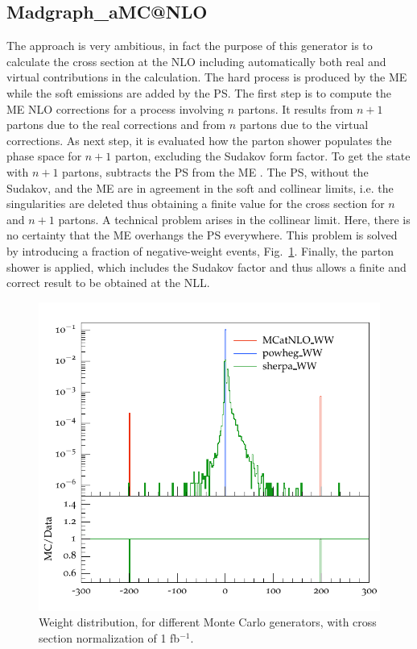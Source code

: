 \subsection*{Madgraph\_aM{\footnotesize C@NLO}}
The \aMC \cite{bib:madgraph} approach is very ambitious, in fact the purpose of this generator is to calculate the cross section at the NLO including automatically both real and virtual contributions in the calculation. The  hard process is produced by the ME  while the soft emissions are added by the PS.
The first step is to compute the ME NLO corrections for a process involving $n$ partons. 
It results from  $n+1$ partons due to the real corrections and from $n$ partons due to the virtual corrections. 
As next step, it is evaluated  how the parton shower populates the phase space for $ n + 1 $ parton, excluding the Sudakov form factor. 
To get the state with $n+1$ partons, \aMC subtracts the PS  from the ME . 
The PS, without the Sudakov,  and the ME are in agreement in the soft and collinear limits, i.e. the singularities are deleted thus obtaining a finite value for the cross section for $ n $ and $ n + 1 $ partons. 
A technical problem arises in the collinear limit. Here, there is no certainty that the ME overhangs the PS everywhere. 
This problem is solved by introducing a fraction of negative-weight events, Fig.~\ref{weight}. 
Finally, the parton shower is applied, which includes the Sudakov factor and thus allows a finite and correct result to be obtained at the NLL. 
 \begin{figure}
\centering
\includegraphics[scale= 0.7]{../Cap3/Fig_MC/weight}
\caption{Weight distribution, for different Monte Carlo generators, with cross section normalization of 1 fb$^{-1}$.}
\label{weight}
\end{figure}
 
